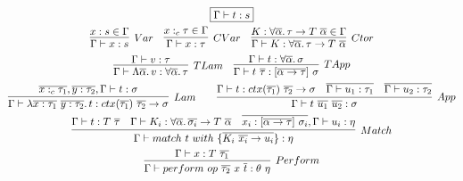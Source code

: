 \documentclass[acmsmall,review,screen]{acmart}
\newcommand{\mathframebox}[1]{\framebox{$\displaystyle #1$}}
\newcommand{\ap}{~}
\begin{document}
\begin{figure}
    \begin{gather*}
        \mathframebox{\Gamma\vdash t : s} \\
        \begin{array}{ccc}
            \infer[Var]{\Gamma\vdash x : s}{x : s \in \Gamma} &
            \infer[CVar]{\Gamma\vdash x : \tau}{x :_c \tau \in \Gamma} &
            \infer[Ctor]{\Gamma\vdash K : \forall \overline{\alpha}\ldotp \tau\to T\ap\overline{\alpha}}{K : \forall \overline{\alpha}\ldotp \tau\to T\ap\overline{\alpha} \in \Gamma}
        \end{array} \\
        \begin{array}{cc}
            \infer[TLam]{
                \Gamma\vdash\Lambda\overline{\alpha}\ldotp v : \forall\overline{\alpha}\ldotp\tau
            }{
                \Gamma\vdash v : \tau
            } &
            \infer[TApp]{
                \Gamma\vdash t\ap\overline{\tau} : [\overline{\alpha\to\tau}]\ap\sigma
            }{
                \Gamma \vdash t : \forall\overline{\alpha}\ldotp \sigma
            }
        \end{array} \\
        \infer[Lam]{
            \Gamma\vdash \lambda \overline{x : \tau_1} ~ \overline{y : \tau_2} \ldotp t : ctx(\overline{\tau_1}) ~ \overline{\tau_2} \to \sigma
        }{
            \overline{x :_c \tau_1}, \overline{y : \tau_2}, \Gamma\vdash t : \sigma
        }
        \text{\hspace{2em}}
        \infer[App]{
            \Gamma\vdash t \ap \overline{u_1} \ap \overline{u_2} : \sigma
        } {
            \Gamma\vdash t : ctx(\overline{\tau_1})~\overline{\tau_2}\to\sigma
            &
            \overline{\Gamma\vdash u_1 : \tau_1}
            &
            \overline{\Gamma\vdash u_2 : \tau_2}
        }\\
        \infer[Match]{
            \Gamma\vdash match ~ t ~with ~\{ \overline{K_i\ap \overline{x_{i}} \to u_i }\} : \eta
        }{
            \Gamma\vdash t : T \ap\overline{\tau} &
            \Gamma\vdash K_i : \forall \overline{\alpha}\ldotp \overline{\sigma_{i}} \to T\ap\overline{\alpha} &
            \overline{x_{i} : [\overline{\alpha\to\tau}]\ap \sigma_{i}}, \Gamma \vdash u_i : \eta
        }\\
        \infer[Perform]{
            \Gamma\vdash perform \ap op\ap \overline{\tau_2}\ap x\ap \overline{t} : \theta\ap\eta
        }{
            \Gamma\vdash x : T\ap \overline{\tau_1} &
}
\end{gather*}
\end{figure}
\end{document}

